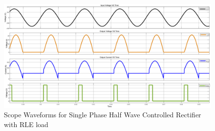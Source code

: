 \begin{figure}[h]
    \centering
    \includegraphics[width=1\textwidth]{images/experiment-1/circuit-scope-experiment-07.png}
    \caption{Scope Waveforms for Single Phase Half Wave Controlled Rectifier with RLE load}
    \label{Fig_waveform_single-phase-half-wave-controlled-rectifier-with-RLE-load}
\end{figure}


\pagebreak

